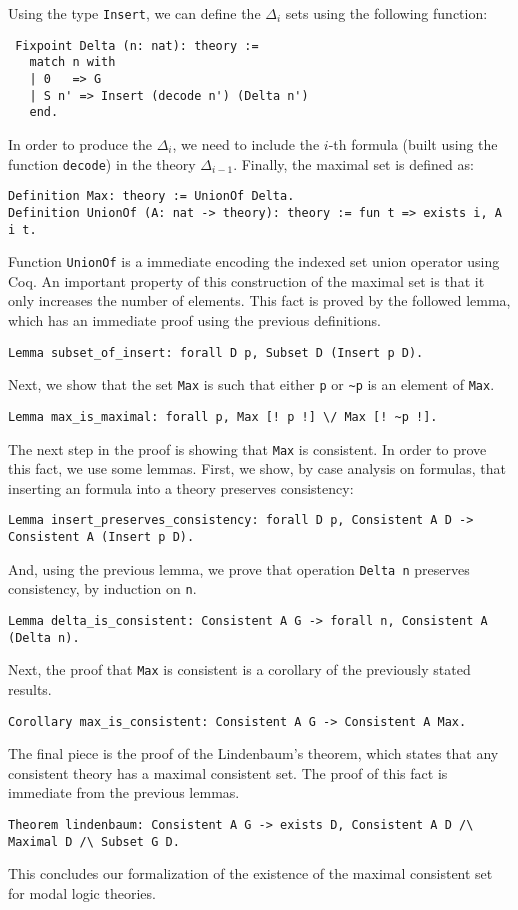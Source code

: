 \documentclass[3p,times]{elsarticle}
\begin{document}
Using the type \texttt{Insert}, we can define the $\Delta_{i}$ sets using the
following function:

\begin{verbatim}
 Fixpoint Delta (n: nat): theory :=
   match n with
   | 0   => G
   | S n' => Insert (decode n') (Delta n')
   end.
\end{verbatim}

In order to produce the $\Delta_{i}$, we need to include the $i$-th formula (built using the function \texttt{decode})
in the theory $\Delta_{i - 1}$. Finally, the maximal set is defined as:
\begin{verbatim}
Definition Max: theory := UnionOf Delta.
Definition UnionOf (A: nat -> theory): theory := fun t => exists i, A i t.
\end{verbatim}
Function \texttt{UnionOf} is a immediate encoding the indexed set union operator using Coq. An important property
of this construction of the maximal set is that it only increases the number of elements. This fact is proved by
the followed lemma, which has an immediate proof using the previous definitions.
\begin{verbatim}
Lemma subset_of_insert: forall D p, Subset D (Insert p D).
\end{verbatim}
Next, we show that the set \texttt{Max} is such that either \verb|p| or \verb|~p| is an element of \verb|Max|.
\begin{verbatim}
Lemma max_is_maximal: forall p, Max [! p !] \/ Max [! ~p !].
\end{verbatim}
The next step in the proof is showing that \texttt{Max} is consistent. In order to prove this fact,
we use some lemmas. First, we show, by case analysis on formulas, that inserting an formula into a theory
preserves consistency:
\begin{verbatim}
Lemma insert_preserves_consistency: forall D p, Consistent A D -> Consistent A (Insert p D).
\end{verbatim}
And, using the previous lemma, we prove that operation \texttt{Delta n} preserves consistency, by induction on \verb|n|.
\begin{verbatim}
Lemma delta_is_consistent: Consistent A G -> forall n, Consistent A (Delta n).
\end{verbatim}
Next, the proof that \texttt{Max} is consistent is a corollary of the previously stated results.
\begin{verbatim}
Corollary max_is_consistent: Consistent A G -> Consistent A Max.
\end{verbatim}
The final piece is the proof of the Lindenbaum's theorem, which states that any consistent theory has
a maximal consistent set. The proof of this fact is immediate from the previous lemmas.
\begin{verbatim}
Theorem lindenbaum: Consistent A G -> exists D, Consistent A D /\ Maximal D /\ Subset G D.
\end{verbatim}
This concludes our formalization of the existence of the maximal consistent set for modal logic theories.
\end{document}
